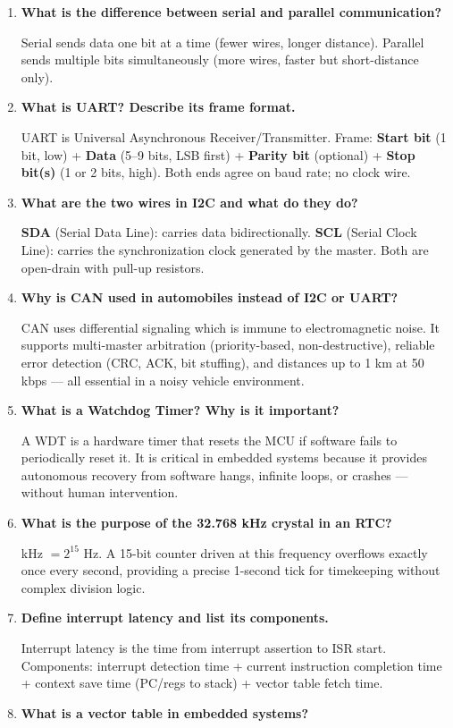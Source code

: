 \documentclass[12pt,a4paper]{article}
\newcommand{\Q}[1]{\textbf{#1}\par\noindent\ignorespaces}
\begin{document}
\begin{tcolorbox}[exambox, title={\textbf{Frequently Asked / Viva Questions}}]
\begin{enumerate}[topsep=0pt, label=\textbf{Q\arabic*.}, itemsep=5pt]
  \item \Q{What is the difference between serial and parallel communication?}
    Serial sends data one bit at a time (fewer wires, longer distance). Parallel sends multiple bits simultaneously (more wires, faster but short-distance only).
  \item \Q{What is UART? Describe its frame format.}
    UART is Universal Asynchronous Receiver/Transmitter. Frame: \textbf{Start bit} (1 bit, low) + \textbf{Data} (5--9 bits, LSB first) + \textbf{Parity bit} (optional) + \textbf{Stop bit(s)} (1 or 2 bits, high). Both ends agree on baud rate; no clock wire.
  \item \Q{What are the two wires in I2C and what do they do?}
    \textbf{SDA} (Serial Data Line): carries data bidirectionally. \textbf{SCL} (Serial Clock Line): carries the synchronization clock generated by the master. Both are open-drain with pull-up resistors.
  \item \Q{Why is CAN used in automobiles instead of I2C or UART?}
    CAN uses differential signaling which is immune to electromagnetic noise. It supports multi-master arbitration (priority-based, non-destructive), reliable error detection (CRC, ACK, bit stuffing), and distances up to 1 km at 50 kbps --- all essential in a noisy vehicle environment.
  \item \Q{What is a Watchdog Timer? Why is it important?}
    A WDT is a hardware timer that resets the MCU if software fails to periodically reset it. It is critical in embedded systems because it provides autonomous recovery from software hangs, infinite loops, or crashes --- without human intervention.
  \item \Q{What is the purpose of the 32.768 kHz crystal in an RTC?}
    32.768 kHz $= 2^{15}$ Hz. A 15-bit counter driven at this frequency overflows exactly once every second, providing a precise 1-second tick for timekeeping without complex division logic.
  \item \Q{Define interrupt latency and list its components.}
    Interrupt latency is the time from interrupt assertion to ISR start. Components: interrupt detection time + current instruction completion time + context save time (PC/regs to stack) + vector table fetch time.
  \item \Q{What is a vector table in embedded systems?}

\end{enumerate}
\end{tcolorbox}
\end{document}
